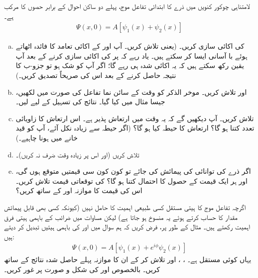 لامتناہی چوکور کنویں میں  ذرے کا ابتدائی تفاعل موج، پہلے دو ساکن احوال کے برابر حصوں کا مرکب ہے۔ 
\begin{align*}
\Psi(x,0) = A[\psi_{1}(x) + \psi_{2}(x)]
\end{align*}
\begin{enumerate}[a.]
\item 
{} کی اکائی سازی کریں۔ (یعنی   تلاش کریں۔ آپ  اور  کے  اکائی تعامد کا فائدہ اٹھاتے ہوئے با آسانی ایسا کر سکتے ہیں۔ یاد رہے کہ  پر  کی اکائی سازی کرنے کے بعد آپ یقین رکھ سکتے ہیں کہ یہ اکائی شدہ ہی رہے گا؛ اگر آپ کو شک ہو تو جزو-ب کا نتیجہ حاصل کرنے کے بعد اس کی صریحاً تصدیق کریں۔) 
\item
{} اور   تلاش کریں۔ موخر الذکر کو وقت کے سائن نما تفاعل کی صورت میں لکھیں، جیسا مثال   میں کیا گیا۔ نتائج کی تسہیل کے لیے  لیں۔ 
\item 
{}  تلاش کریں۔ آپ دیکھیں گے کہ یہ وقت میں ارتعاش پذیر ہے۔ اس ارتعاش کا زاویائی تعدد کتنا ہو گا؟ ارتعاش کا حیطہ کیا ہو گا؟ (اگر حیطہ  سے زیادہ نکل آئے،  آپ  کو قید خانے میں ہونا چاہیے۔) 
\item 
{} تلاش کریں (اور اس پر زیادہ وقت صَرف نہ کریں)۔ 
\item
اگر  ذرے کی توانائی کی پیمائش کی جائے تو کون کون سی قیمتیں متوقع ہوں گی،  اور ہر ایک قیمت کے حصول  کا احتمال کتنا ہو گا؟  کی توقعاتی قیمت تلاش کریں۔ اس کی قیمت کا موازنہ  اور   کے ساتھ کریں؟
\end{enumerate}
اگرچہ تفاعل موج کا    ہیتی مستقل کسی طبیعی اہمیت کا حامل نہیں  (کیونکہ کسی بھی قابل پیمائش مقدار کا حساب کرتے ہوئے یہ  منسوخ ہو جاتا ہے) لیکن مساوات  میں ضرائب  کے   باہمی  ہیتی فرق اہمیت رکھتے ہیں۔  مثال کے طور پر، فرض کریں کہ ہم سوال  میں  اور  کی  باہمی ہیتیں  تبدیل کر دیتے ہیں:
\begin{align*}
\Psi (x,0) = A[\psi_{1} (x) + e^{i\phi}\psi_{2}(x)]
\end{align*}
یہاں   کوئی مستقل ہے۔ ، ،  اور    تلاش کر کے ان کا موازنہ پہلے حاصل شدہ نتائج کے ساتھ کریں۔ بالخصوص  اور   کی  شکل و صورت  پر غور کریں۔ 
